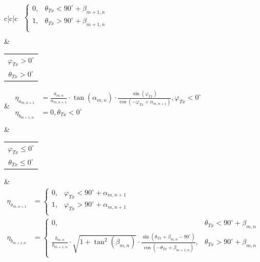 \begin{table}[tb]
\begin{tabular}{c|c|c}
\begin{math}
\begin{aligned}
\begin{cases}
				0, & \theta_{Tx} < 90^\circ + \beta_{m+1,n}\\
				1, & \theta_{Tx} > 90^\circ + \beta_{m+1,n}\\
			\end{cases}\\
		\end{aligned}		
	\end{math}\\
		\hline
		& 
		\begin{tabular}{@{}c@{}}$\varphi_{Tx}>0^\circ $ \\ $\theta_{Tx}>0^\circ $ \end{tabular}
		&
		\begin{math}
			\begin{aligned}
				\eta_{a_{m,n+1}} &= \frac{a_{m,n}}{a_{m,n+1}} \cdot \tan(\alpha_{m,n}) \cdot \frac{\sin(\varphi_{Tx})}{\cos(-\varphi_{Tx}+ \alpha_{m,n+1})}, \varphi_{Tx} < 0^\circ \\
				\eta_{b_{m+1,n}} &= 0,\theta_{Tx} < 0^\circ \\
			\end{aligned}		
		\end{math}\\ 
		& 
		\begin{tabular}{@{}c@{}}$\varphi_{Tx} \leq 0^\circ $ \\ $\theta_{Tx} \leq 0^\circ $ \end{tabular}
		&
			\begin{math}
			\begin{aligned}
				\eta_{a_{m,n+1}} &=
				\begin{cases}
					0, & \varphi_{Tx} < 90^\circ + \alpha_{m,n+1}\\
					1, & \varphi_{Tx} > 90^\circ + \alpha_{m,n+1}\\
				\end{cases}\\
				\eta_{b_{m+1,n}} &=
				\begin{cases}
					0, & \theta_{Tx} < 90^\circ + \beta_{m,n}\\
					\frac{b_{m,n}}{b_{m+1,n}} \cdot \sqrt{1+ \tan^2 (\beta_{m,n})} \cdot \frac{\sin(\theta_{Tx}+ \beta_{m,n}- 90^\circ)}{\cos(-\theta_{Tx}+ \beta_{m+1,n})}, & \theta_{Tx} > 90^\circ + \beta_{m,n}\\

\end{cases}
\end{aligned}
\end{math}
\end{tabular}
\end{table}
